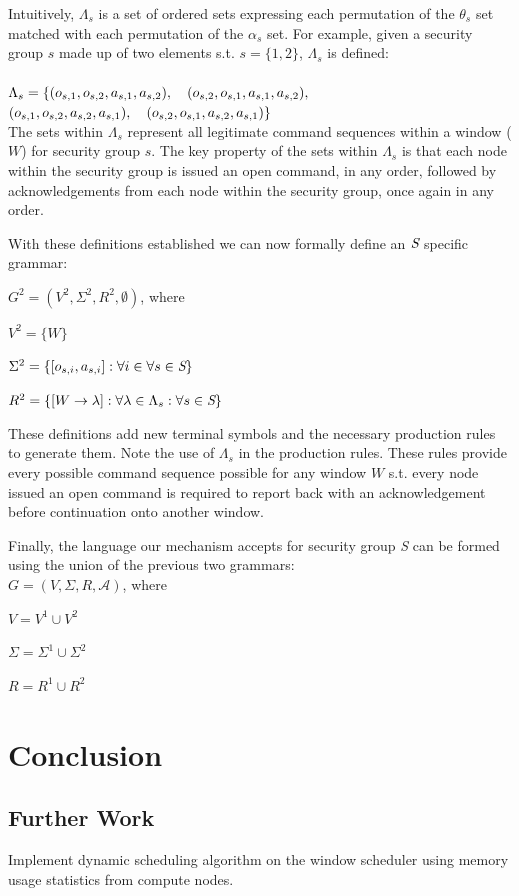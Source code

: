 \documentclass{article}
\newcommand{\tab}{\hspace*{2em}}
\begin{document}
Intuitively, $\Lambda_s$ is a set of ordered sets expressing each permutation of the $\theta_s$ set matched with each permutation of the $\alpha_s$ set. For example, given a security group $s$ made up of two elements s.t. $s = \{1, 2\}$, $\Lambda_s$ is defined:\\
\\
$\Lambda_s = \{ (o_{s,1}, o_{s,2}, a_{s,1}, a_{s,2}),\hspace*{1.0em} (o_{s,2}, o_{s,1}, a_{s,1}, a_{s,2}),$\\
\hspace*{3.0em}$ (o_{s,1}, o_{s,2}, a_{s,2}, a_{s,1}),\hspace*{1.0em} (o_{s,2}, o_{s,1}, a_{s,2}, a_{s,1})\}$\\

The sets within $\Lambda_s$ represent all legitimate command sequences within a window ($W$) for security group $s$. The key property of the sets within $\Lambda_s$ is that each node within the security group is issued an open command, in any order, followed by acknowledgements from each node within the security group, once again in any order.

With these definitions established we can now formally define an $\emph{S}$ specific grammar:

\tab $G^2 = (V^2, \Sigma^2, R^2, \emptyset)$, where

\tab $V^2 =\{W\}$

\tab $\Sigma ^2 = \{[o_{s,i}, a_{s,i}]:\forall i \in \forall s\in \emph{S}\}$

\tab $R^2 = \{[W\rightarrow \lambda  ] :\forall \lambda \in \Lambda_s :\forall s\in \emph{S}\}$


These definitions add new terminal symbols and the necessary production rules to generate them. Note the use of $\Lambda_s$ in the production rules. These rules provide every possible command sequence possible for any window $W$ s.t. every node issued an open command is required to report back with an acknowledgement before continuation onto another window.

Finally, the language our mechanism accepts for security group \emph{S} can be formed using the union of the previous two grammars:\\

\tab $G = (V, \Sigma , R, \mathcal{A})$, where

\tab $V = V^1\cup V^2$

\tab $\Sigma = \Sigma ^1\cup \Sigma ^2$

\tab $R = R^1\cup R^2$
\section{Conclusion}
\subsection{Further Work}
Implement dynamic scheduling algorithm on the window scheduler using memory usage statistics from compute nodes. 



\end{document}
